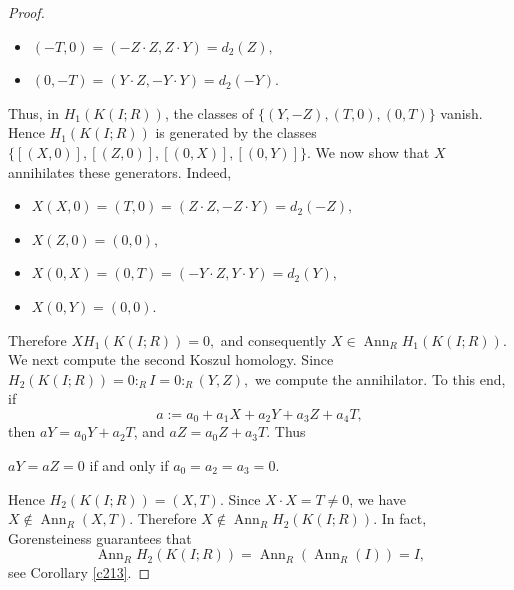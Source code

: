 \documentclass[11pt,a4paper]{amsart}
\numberwithin{equation}{section}
\DeclareMathOperator{\Ann}{Ann}\DeclareMathOperator{\ann}{Ann}
\begin{document}
\begin{proof}
\begin{itemize}
		\item $
		(-T,0)=(-Z\cdot Z,Z\cdot Y)=d_2(Z),
		$
		\item$
		(0,-T)=(Y\cdot Z,-Y\cdot Y)=d_2(-Y).
		$
	\end{itemize}
	Thus, in $H_1(K(I;R))$, the classes of
	$\{ 
	(Y,-Z),  (T,0),  (0,T)
	\}$
	vanish. Hence $H_1(K(I;R))$ is generated by the classes
	$
	\{	[(X,0)],  [(Z,0)],  [(0,X)],  [(0,Y)]\}.
	$ We now show that $X$ annihilates these generators. Indeed,
	
	\begin{itemize}
		\item $
		X(X,0)=(T,0)=(Z\cdot Z,-Z\cdot Y)=d_2(-Z),
		$
		
		\item $
		X(Z,0)=(0,0),$
		
		\item
		$
		X(0,X)=(0,T)=(-Y \cdot Z,Y \cdot Y)=d_2(Y),
		$	\item$
		X(0,Y)=(0,0).
		$
	\end{itemize}	
	Therefore
	$
	XH_1(K(I;R))=0,
	$	and consequently
	$
	X\in\Ann_R H_1(K(I;R)).
	$
	We next compute the second Koszul homology. Since
	$
	H_2(K(I;R))=0:_R I
	=0:_R(Y,Z),$
	we compute the annihilator. To this end, if
	$$
	a:=a_0+a_1X+a_2Y+a_3Z+a_4T,
	$$
	then
	$aY=a_0Y+a_2T$, and
	$aZ=a_0Z+a_3T.$ Thus
	\begin{center}  $aY=aZ=0$ if and only if
		$
		a_0=a_2=a_3=0.
		$\end{center}
	Hence
	$
	H_2(K(I;R))=(X,T).
	$
	Since $X\cdot X=T\neq0$, we have
	$
	X\notin\Ann_R(X,T).
	$
	Therefore
	$
	X\notin\Ann_R H_2(K(I;R)).
	$
	In fact,  Gorensteiness guarantees that
	$$
	\Ann_R H_2(K(I;R))
	=\Ann_R(\Ann_R(I))
	=I,$$
	see Corollary \ref{c213}.
\end{proof}

	\maketitle
\end{document}
